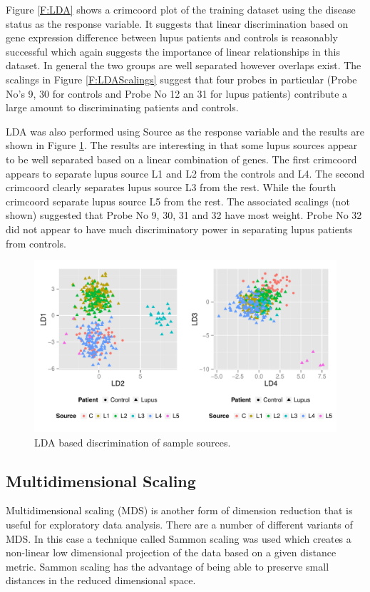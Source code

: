 \documentclass[a4paper, 12pt]{report}
\begin{document}
Figure \ref{F:LDA} shows a crimcoord plot of the training dataset using the disease status as the response variable. It suggests that linear discrimination based on gene expression difference between lupus patients and controls is reasonably successful which again suggests the importance of linear relationships in this dataset. In general the two groups are well separated however overlaps exist. The scalings in Figure \ref{F:LDAScalings} suggest that four probes in particular (Probe No's 9, 30 for controls and Probe No 12 an 31 for lupus patients) contribute a large amount to discriminating patients and controls. 

LDA was also performed using Source as the response variable and the results are shown in Figure \ref{F:LDAType}. The results are interesting in that some lupus sources appear to be well separated based on a linear combination of genes. The first crimcoord appears to separate lupus source L1 and L2 from the controls and L4. The second crimcoord clearly separates lupus source L3 from the rest. While the fourth crimcoord separate lupus source L5 from the rest. The associated scalings (not shown) suggested that Probe No 9, 30, 31 and 32 have most weight. Probe No 32 did not appear to have much discriminatory power in separating lupus patients from controls.

\begin{figure}[H]
\begin{centering}
\includegraphics[width=\textwidth]{ldaType.pdf}
\caption{LDA based discrimination of sample sources.} 
 \label{F:LDAType}
\end{centering}
\end{figure}

\subsection*{Multidimensional Scaling}
Multidimensional scaling (MDS) is another form of dimension reduction that is useful for exploratory data analysis. There are a number of different variants of \gls{MDS}. In this case a technique called Sammon scaling was used which creates a non-linear low dimensional projection of the data based on a given distance metric. Sammon scaling has the advantage of being able to preserve small distances in the reduced dimensional space. 
\end{document}
